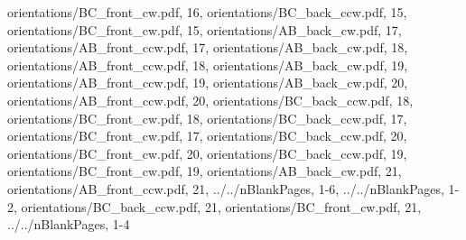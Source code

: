 \documentclass[letterpaper]{article}
\begin{document}
{			orientations/BC_front_cw.pdf, 	16,	
			orientations/BC_back_ccw.pdf, 	15,	
			orientations/BC_front_cw.pdf, 	15,	
			orientations/AB_back_cw.pdf, 		17,
			orientations/AB_front_ccw.pdf, 	17,
			orientations/AB_back_cw.pdf, 		18,
			orientations/AB_front_ccw.pdf, 	18,
			orientations/AB_back_cw.pdf, 		19,
			orientations/AB_front_ccw.pdf, 	19,
			orientations/AB_back_cw.pdf, 		20,
			orientations/AB_front_ccw.pdf, 	20,
			orientations/BC_back_ccw.pdf, 	18,	
			orientations/BC_front_cw.pdf, 	18,	
			orientations/BC_back_ccw.pdf, 	17,	
			orientations/BC_front_cw.pdf, 	17,	
			orientations/BC_back_ccw.pdf, 	20,	
			orientations/BC_front_cw.pdf, 	20,	
			orientations/BC_back_ccw.pdf, 	19,	
			orientations/BC_front_cw.pdf, 	19,	
			orientations/AB_back_cw.pdf, 		21,
			orientations/AB_front_ccw.pdf, 	21,
			../../nBlankPages,							1-6,
			../../nBlankPages,							1-2,
			orientations/BC_back_ccw.pdf, 	21,	
			orientations/BC_front_cw.pdf, 	21,	
			../../nBlankPages,							1-4
		}
\end{document}
